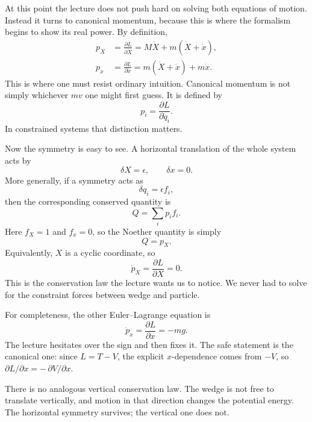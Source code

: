 At this point the lecture does not push hard on solving both equations of motion. Instead it turns to canonical momentum, because this is where the formalism begins to show its real power. By definition,
\begin{align}
p_X&=\frac{\partial L}{\partial \dot X}
   =M\dot X+m(\dot X+\dot x),\\
p_x&=\frac{\partial L}{\partial \dot x}
   =m(\dot X+\dot x)+m\dot x.
\end{align}
This is where one must resist ordinary intuition. Canonical momentum is not simply whichever \(mv\) one might first guess. It is defined by
\begin{equation}
p_i=\frac{\partial L}{\partial \dot q_i}.
\end{equation}
In constrained systems that distinction matters.

Now the symmetry is easy to see. A horizontal translation of the whole system acts by
\begin{equation}
\delta X=\epsilon,\qquad \delta x=0.
\end{equation}
More generally, if a symmetry acts as
\begin{equation}
\delta q_i=\epsilon f_i,
\end{equation}
then the corresponding conserved quantity is
\begin{equation}
Q=\sum_i p_i f_i.
\end{equation}
Here \(f_X=1\) and \(f_x=0\), so the Noether quantity is simply
\begin{equation}
Q=p_X.
\end{equation}
Equivalently, \(X\) is a cyclic coordinate, so
\begin{equation}
\dot p_X=\frac{\partial L}{\partial X}=0.
\end{equation}
This is the conservation law the lecture wants us to notice. We never had to solve for the constraint forces between wedge and particle.

For completeness, the other Euler--Lagrange equation is
\begin{equation}
\dot p_x=\frac{\partial L}{\partial x}=-mg.
\end{equation}
The lecture hesitates over the sign and then fixes it. The safe statement is the canonical one: since \(L=T-V\), the explicit \(x\)-dependence comes from \(-V\), so \(\partial L/\partial x=-\,\partial V/\partial x\).

There is no analogous vertical conservation law. The wedge is not free to translate vertically, and motion in that direction changes the potential energy. The horizontal symmetry survives; the vertical one does not.

